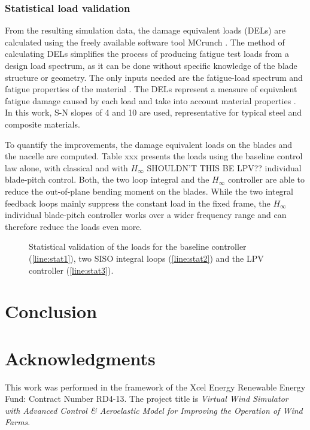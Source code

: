 \documentclass[times]{weauth}
\begin{document}
\subsubsection*{Statistical load validation}

From the resulting simulation data, the damage
equivalent loads (DELs) are calculated using the freely available software tool
MCrunch \cite{MCrunch08}. The method of calculating DELs simplifies the process
of producing fatigue test loads from a design load spectrum, as it can be done
without specific knowledge of the blade structure or geometry. The only inputs
needed are the fatigue-load spectrum and fatigue properties of the material
\cite{freebury00}. The DELs represent a measure of equivalent
fatigue damage caused by each load and take into account material properties \cite{Bossanyi03a}.
In this work, S-N slopes of 4 and 10 are used, representative for typical steel and
composite materials. 


To quantify the improvements, the damage equivalent loads on
the blades and the nacelle are computed. Table xxx presents the loads
using the baseline control law alone, with classical and with $H_\infty$ SHOULDN'T THIS BE LPV??
individual blade-pitch control. Both, the two loop integral and the $H_\infty$ controller are able to reduce the
out-of-plane bending moment on the blades. While the two integral feedback loops
mainly suppress the constant load in the fixed frame, the
$H_\infty$ individual blade-pitch controller works over a wider frequency range
and can therefore reduce the loads even more.

\begin{figure}[hbt]
	\centering
	
	\caption{Statistical validation of the loads for the baseline controller (\ref{line:stat1}), two SISO integral loops (\ref{line:stat2}) and the LPV controller (\ref{line:stat3}).}
	\label{fig:load_stat}	
\end{figure}



\newpage
\section{Conclusion}

\section{Acknowledgments}
	This work was performed in the framework of the Xcel Energy Renewable Energy Fund: Contract Number RD4-13.
	The project title is \textit{Virtual Wind Simulator with Advanced Control \& Aeroelastic Model for Improving the
		Operation of Wind Farms}. 	








\end{document}
